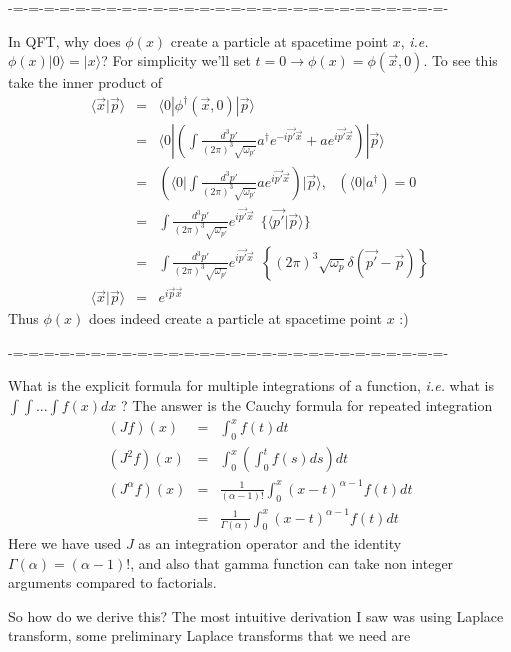 \documentclass[aps,preprint,preprintnumbers,nofootinbib,showpacs,prd]{revtex4-1}
\newcommand{\ie}{{\it i.e.} }
\newcommand{\nbea}{\begin{eqnarray*}}
\newcommand{\neea}{\end{eqnarray*}}
\begin{document}
-=-=-=-=-=-=-=-=-=-=-=-=-=-=-=-=-=-=-=-=-=-=-=-=-=-=-=-=-

In QFT, why does $\phi(x)$ create a particle at spacetime point $x$, \ie $\phi(x)| 0 \rangle = |x \rangle$? For simplicity we'll set $t = 0 \rightarrow \phi(x) = \phi(\vec x, 0)$. To see this take the inner product of
\nbea
\langle \vec x | \vec p \rangle & = & \langle 0 |\phi^\dagger(\vec x, 0) | \vec p \rangle \\
& = & \langle 0 | \left ( \int \frac{d^3 p'}{(2 \pi)^3 \sqrt{\omega_{p'}}} a^\dagger e^{-i\vec {p'} \vec x} +  a e^{i\vec {p'} \vec x} \right ) | \vec p \rangle \\
& = & \left ( \langle 0 | \int \frac{d^3 p'}{(2 \pi)^3 \sqrt{\omega_{p'}}} a e^{i\vec {p'} \vec x} \right ) | \vec p \rangle, ~~~ ( \langle 0 | a^\dagger ) = 0 \\
& = & \int \frac{d^3 p'}{(2 \pi)^3 \sqrt{\omega_{p'}}} e^{i\vec {p'} \vec x} ~~ \{ \langle \vec {p'} | \vec p \rangle \} \\
& = & \int \frac{d^3 p'}{(2 \pi)^3 \sqrt{\omega_{p'}}} e^{i\vec {p'} \vec x} ~~ \left \{ (2 \pi)^3 \sqrt{\omega_{p}} \delta (\vec {p'} - \vec p) \right \} \\
\langle \vec x | \vec p \rangle & = & e^{i\vec {p} \vec x}
\neea
Thus $\phi(x)$ does indeed create a particle at spacetime point $x$ :)

-=-=-=-=-=-=-=-=-=-=-=-=-=-=-=-=-=-=-=-=-=-=-=-=-=-=-=-=-

What is the explicit formula for multiple integrations of a function, \ie what is $\int\int ... \int f(x) dx$ ? The answer is the Cauchy formula for repeated integration
\nbea
(J f)(x) & = & \int_0^x f(t) dt \\
(J^2 f)(x) & = & \int_0^x \left ( \int_0^t f(s) ds \right ) dt \\
(J^\alpha f)(x) & = & \frac{1}{(\alpha - 1)!}\int_0^x (x - t)^{\alpha-1} f(t) dt \\
& = & \frac{1}{\Gamma(\alpha)}\int_0^x (x - t)^{\alpha-1} f(t) dt
\neea
Here we have used $J$ as an integration operator and the identity $\Gamma(\alpha) = (\alpha-1)!$, and also that gamma function can take non integer arguments compared to factorials.

So how do we derive this? The most intuitive derivation I saw was using Laplace transform, some preliminary Laplace transforms that we need are
\end{document}
